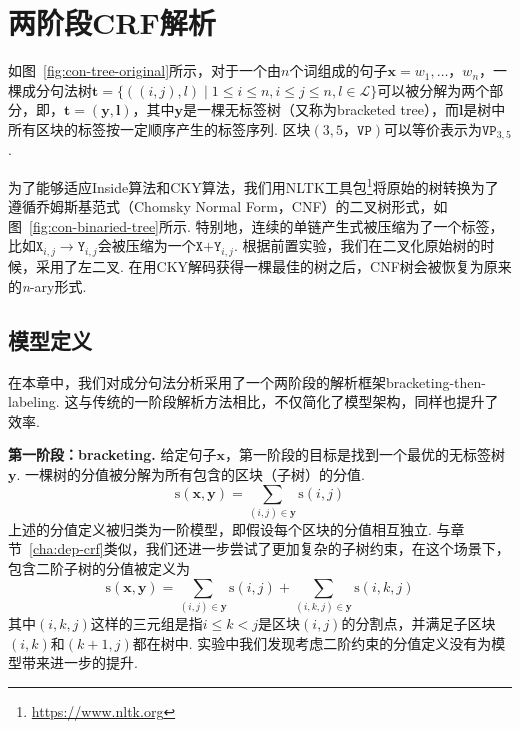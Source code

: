 \section{两阶段CRF解析}\label{sec:2stage-parsing}

如图~\ref{fig:con-tree-original}所示，对于一个由$n$个词组成的句子$\boldsymbol{x}=w_1,\dots，w_{n}$，一棵成分句法树$\boldsymbol{t}=\{((i, j),l)\mid 1\le i \le n,i \le j \le n,l \in \mathcal{L}\}$可以被分解为两个部分，即，$\boldsymbol{t}=(\boldsymbol{y}, \boldsymbol{l})$，其中$\boldsymbol{y}$是一棵无标签树（又称为bracketed tree），而$\boldsymbol{l}$是树中所有区块的标签按一定顺序产生的标签序列.
区块$(3,5，\texttt{VP})$可以等价表示为$\texttt{VP}_{3,5}$.

为了能够适应Inside算法和CKY算法，我们用NLTK工具包\footnote{\url{https://www.nltk.org}}将原始的树转换为了遵循乔姆斯基范式（Chomsky Normal Form，CNF）的二叉树形式，如图~\ref{fig:con-binaried-tree}所示.
特别地，连续的单链产生式被压缩为了一个标签，比如$\texttt{X}_{i,j} \rightarrow \texttt{Y}_{i,j}$会被压缩为一个$\texttt{X+Y}_{i,j}$.
根据前置实验，我们在二叉化原始树的时候，采用了左二叉.
在用CKY解码获得一棵最佳的树之后，CNF树会被恢复为原来的\textit{n}-ary形式.

\subsection{模型定义}\label{sub@sec:con-crf-model-definition}

在本章中，我们对成分句法分析采用了一个两阶段的解析框架bracketing-then-labeling.
这与传统的一阶段解析方法\citep{stern-etal-2017-minimal,gaddy-etal-2018-whats}相比，不仅简化了模型架构，同样也提升了效率.

\noindent\textbf{第一阶段：bracketing.}
给定句子$\boldsymbol{x}$，第一阶段的目标是找到一个最优的无标签树$\boldsymbol{y}$.
一棵树的分值被分解为所有包含的区块（子树）的分值.
\begin{equation} \label{eq:tree-score}
  \mathrm{s}(\boldsymbol{x},\boldsymbol{y}) = \sum\limits_{(i,j)\in \boldsymbol{y}}\mathrm{s}(i,j)
\end{equation}
上述的分值定义被归类为一阶模型，即假设每个区块的分值相互独立.
与章节~\ref{cha:dep-crf}类似，我们还进一步尝试了更加复杂的子树约束，在这个场景下，包含二阶子树的分值被定义为
\begin{equation} \label{eq:2ostree-score}
  \mathrm{s}(\boldsymbol{x},\boldsymbol{y}) = \sum\limits_{(i,j)\in \boldsymbol{y}}\mathrm{s}(i,j)+\sum\limits_{(i,k,j)\in \boldsymbol{y}}\mathrm{s}(i,k,j)
\end{equation}
其中$(i,k,j)$这样的三元组是指$i \leq k < j$是区块$(i,j)$的分割点，并满足子区块$(i,k)$和$(k+1,j)$都在树中.
实验中我们发现考虑二阶约束的分值定义没有为模型带来进一步的提升.

